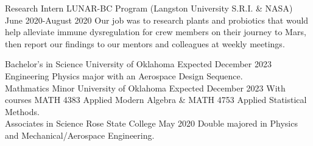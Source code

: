 \documentclass[11pt]{spidercv}
\begin{document}
    





    \begin{MainPart}

    \Experience
        {\ColorHighlight}
		{Research Intern}
		{LUNAR-BC Program (Langston University S.R.I. \& NASA)}
        {June 2020-August 2020}
        {           \vspace*{0.5cm}
            Our job was to research plants and probiotics that would help alleviate immune dysregulation for
crew members on their journey to Mars, then report our findings to our mentors and colleagues
at weekly meetings.\\
                   \vspace*{0.5cm} 
        }


    
    \Experience
        {\ColorHighlight}
		{Bachelor's in Science}
		{University of Oklahoma}
        {Expected December 2023}
        {           \vspace*{0.5cm}
            Engineering Physics major with an Aerospace Design Sequence. \\
                    \vspace*{0.5cm}  
        }
    \Experience
        {\ColorHighlight}
		{Mathmatics Minor}
		{University of Oklahoma}
        {Expected December 2023}
        {           \vspace*{0.5cm}
            With courses MATH 4383 Applied Modern Algebra \& MATH 4753 Applied Statistical Methods. \\
                    \vspace*{0.5cm}  
        }
    \Experience
        {\ColorHighlight}
		{Associates in Science}
		{Rose State College}
        {May 2020}
        {           \vspace*{0.5cm}
            Double majored in Physics and Mechanical/Aerospace Engineering.\\
                    \vspace*{0.5cm}
        }



\end{MainPart}
\end{document}
